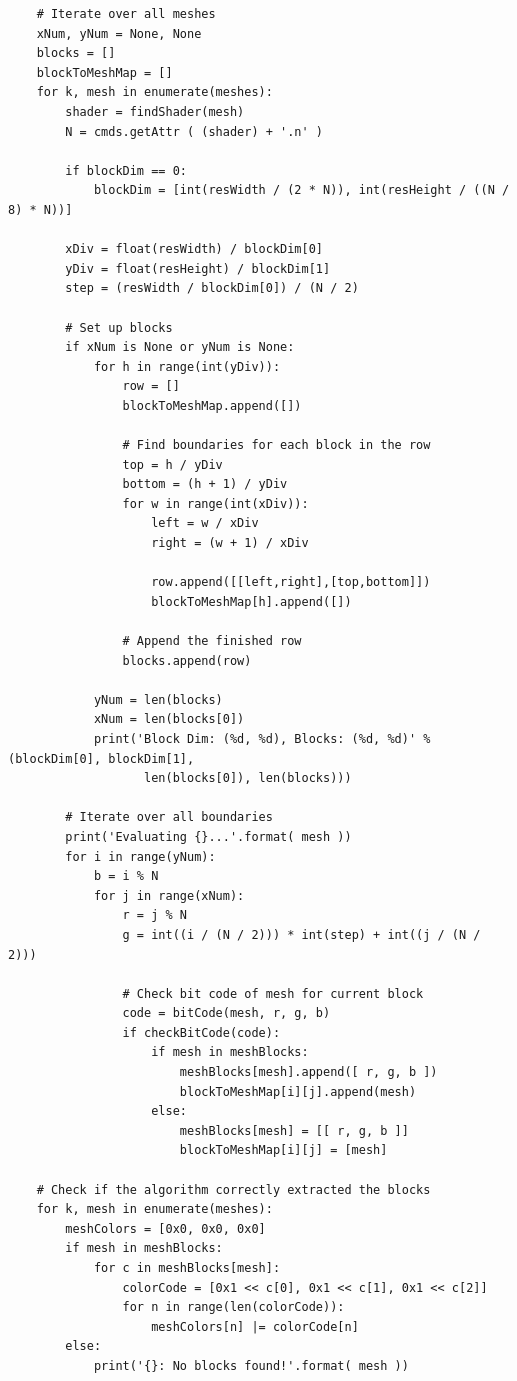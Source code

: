 \documentclass[conference]{IEEEtran}
\begin{document}
{{\begin{verbatim}
    # Iterate over all meshes
    xNum, yNum = None, None
    blocks = []
    blockToMeshMap = []
    for k, mesh in enumerate(meshes):
        shader = findShader(mesh)
        N = cmds.getAttr ( (shader) + '.n' )
        
        if blockDim == 0:
            blockDim = [int(resWidth / (2 * N)), int(resHeight / ((N / 8) * N))]
        
        xDiv = float(resWidth) / blockDim[0]
        yDiv = float(resHeight) / blockDim[1]
        step = (resWidth / blockDim[0]) / (N / 2)
        
        # Set up blocks
        if xNum is None or yNum is None:
            for h in range(int(yDiv)):
                row = []
                blockToMeshMap.append([])
                
                # Find boundaries for each block in the row
                top = h / yDiv
                bottom = (h + 1) / yDiv
                for w in range(int(xDiv)):
                    left = w / xDiv
                    right = (w + 1) / xDiv
                    
                    row.append([[left,right],[top,bottom]])
                    blockToMeshMap[h].append([])
                    
                # Append the finished row
                blocks.append(row)
            
            yNum = len(blocks)
            xNum = len(blocks[0])
            print('Block Dim: (%d, %d), Blocks: (%d, %d)' % (blockDim[0], blockDim[1],
                   len(blocks[0]), len(blocks)))
    
        # Iterate over all boundaries
        print('Evaluating {}...'.format( mesh ))
        for i in range(yNum):
            b = i % N
            for j in range(xNum):
                r = j % N
                g = int((i / (N / 2))) * int(step) + int((j / (N / 2)))
                            
                # Check bit code of mesh for current block
                code = bitCode(mesh, r, g, b)
                if checkBitCode(code):
                    if mesh in meshBlocks:
                        meshBlocks[mesh].append([ r, g, b ])
                        blockToMeshMap[i][j].append(mesh)
                    else:
                        meshBlocks[mesh] = [[ r, g, b ]]
                        blockToMeshMap[i][j] = [mesh]
                        
    # Check if the algorithm correctly extracted the blocks
    for k, mesh in enumerate(meshes):
        meshColors = [0x0, 0x0, 0x0]
        if mesh in meshBlocks:
            for c in meshBlocks[mesh]:
                colorCode = [0x1 << c[0], 0x1 << c[1], 0x1 << c[2]]
                for n in range(len(colorCode)):
                    meshColors[n] |= colorCode[n]
        else:
            print('{}: No blocks found!'.format( mesh ))
        

\end{verbatim}}}
\end{document}
